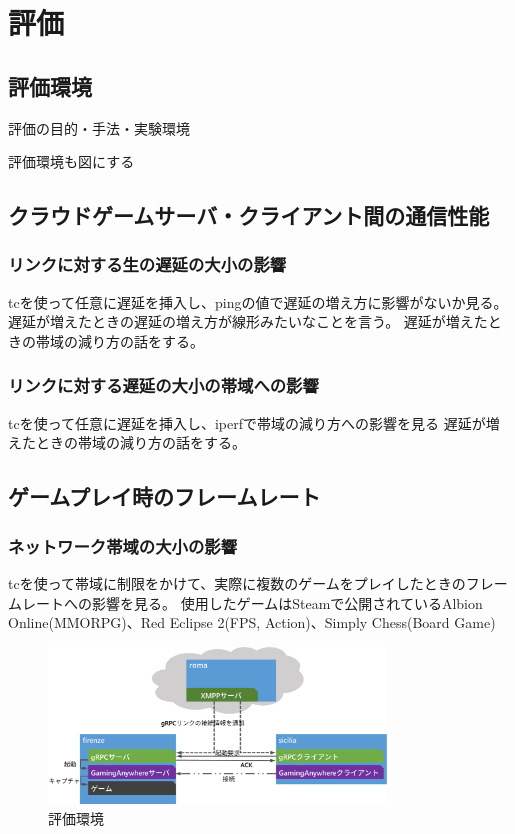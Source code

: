 \section{評価}

\subsection{評価環境}
評価の目的・手法・実験環境

評価環境も図にする

\subsection{クラウドゲームサーバ・クライアント間の通信性能}

\subsubsection{リンクに対する生の遅延の大小の影響}
tcを使って任意に遅延を挿入し、pingの値で遅延の増え方に影響がないか見る。
遅延が増えたときの遅延の増え方が線形みたいなことを言う。
遅延が増えたときの帯域の減り方の話をする。

\subsubsection{リンクに対する遅延の大小の帯域への影響}
tcを使って任意に遅延を挿入し、iperfで帯域の減り方への影響を見る
遅延が増えたときの帯域の減り方の話をする。

\subsection{ゲームプレイ時のフレームレート}

\subsubsection{ネットワーク帯域の大小の影響}
tcを使って帯域に制限をかけて、実際に複数のゲームをプレイしたときのフレームレートへの影響を見る。
使用したゲームはSteamで公開されているAlbion Online(MMORPG)、Red Eclipse 2(FPS, Action)、Simply Chess(Board Game)


\begin{figure}[t]
    \centering
    \includegraphics[width=0.8\textwidth,keepaspectratio,clip]{img/experimentalenvironment.eps}
    \caption{評価環境}
    \label{fig:expenv}
\end{figure}

